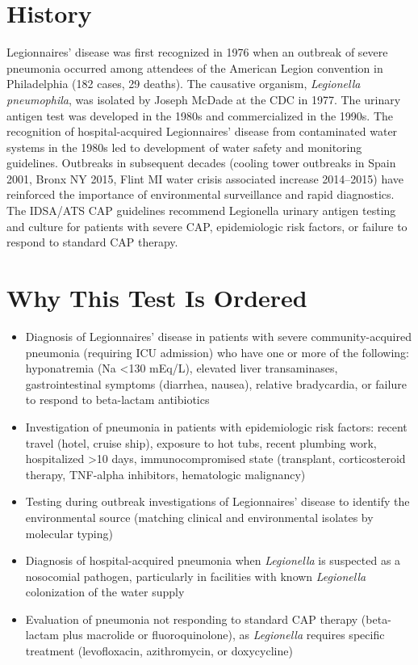 \section*{History}
Legionnaires' disease was first recognized in 1976 when an outbreak of severe pneumonia occurred among attendees of the American Legion convention in Philadelphia (182 cases, 29 deaths). The causative organism, \textit{Legionella pneumophila}, was isolated by Joseph McDade at the CDC in 1977. The urinary antigen test was developed in the 1980s and commercialized in the 1990s. The recognition of hospital-acquired Legionnaires' disease from contaminated water systems in the 1980s led to development of water safety and monitoring guidelines. Outbreaks in subsequent decades (cooling tower outbreaks in Spain 2001, Bronx NY 2015, Flint MI water crisis associated increase 2014--2015) have reinforced the importance of environmental surveillance and rapid diagnostics. The IDSA/ATS CAP guidelines recommend Legionella urinary antigen testing and culture for patients with severe CAP, epidemiologic risk factors, or failure to respond to standard CAP therapy.

\section*{Why This Test Is Ordered}
\begin{itemize}
  \item Diagnosis of Legionnaires' disease in patients with severe community-acquired pneumonia (requiring ICU admission) who have one or more of the following: hyponatremia (Na <130 mEq/L), elevated liver transaminases, gastrointestinal symptoms (diarrhea, nausea), relative bradycardia, or failure to respond to beta-lactam antibiotics
  \item Investigation of pneumonia in patients with epidemiologic risk factors: recent travel (hotel, cruise ship), exposure to hot tubs, recent plumbing work, hospitalized >10 days, immunocompromised state (transplant, corticosteroid therapy, TNF-alpha inhibitors, hematologic malignancy)
  \item Testing during outbreak investigations of Legionnaires' disease to identify the environmental source (matching clinical and environmental isolates by molecular typing)
  \item Diagnosis of hospital-acquired pneumonia when \textit{Legionella} is suspected as a nosocomial pathogen, particularly in facilities with known \textit{Legionella} colonization of the water supply
  \item Evaluation of pneumonia not responding to standard CAP therapy (beta-lactam plus macrolide or fluoroquinolone), as \textit{Legionella} requires specific treatment (levofloxacin, azithromycin, or doxycycline)
\end{itemize}

